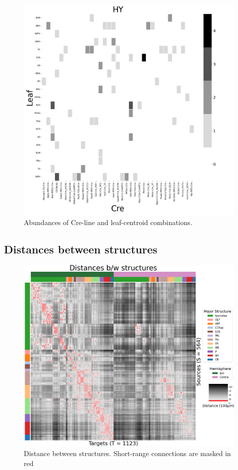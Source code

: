 \begin{figure}[H]
    \centering
    \includegraphics[width = 7in]{figs/HY centroid density.png} 
     \caption{Abundances of Cre-line and leaf-centroid combinations.}
    \label{fig:my_label}
\end{figure}

\newpage

\subsection{Distances between structures}

\begin{figure}[H]
    \centering
    \includegraphics[width = 7in]{figs/distances_leafs.png} 
    \caption{Distance between structures.  Short-range connections are masked in red}
    \label{fig:dist_bw_str}
\end{figure}

